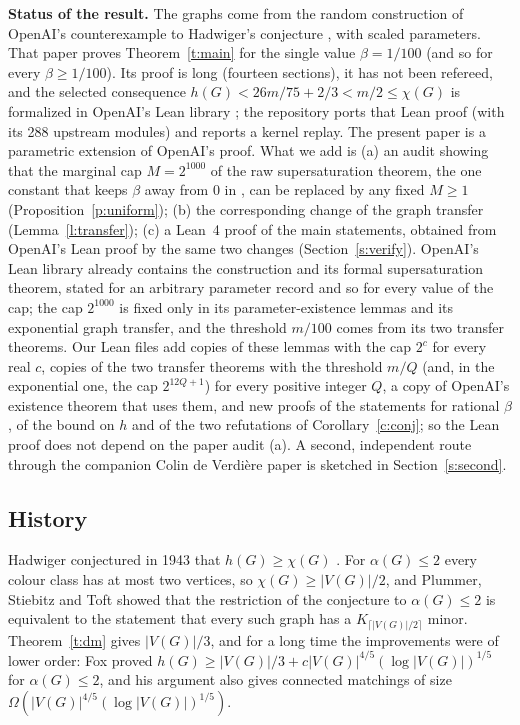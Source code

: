 \documentclass[11pt]{article}
\theoremstyle{definition}\newtheorem{conjecture}[theorem]{Conjecture}
\theoremstyle{remark}\newtheorem{remark}[theorem]{Remark}
\begin{document}
\medskip\noindent\textbf{Status of the result.} The graphs come from the random construction of OpenAI's counterexample to
Hadwiger's conjecture \cite{OAIH}, with scaled parameters. That paper proves Theorem~\ref{t:main} for the single value
$\beta=1/100$ (and so for every $\beta\ge1/100$). Its proof is long (fourteen sections), it has not been refereed, and the
selected consequence $h(G)<26m/75+2/3<m/2\le\chi(G)$ is formalized in OpenAI's Lean library \cite{OAIL}; the repository
\cite{Bon} ports that Lean proof (with its 288 upstream modules) and reports a kernel replay. The present paper is a parametric extension
of OpenAI's proof. What we add is (a) an audit showing that the marginal cap $M=2^{1000}$ of the raw supersaturation
theorem, the one constant that keeps $\beta$ away from $0$ in \cite{OAIH}, can be replaced by any fixed $M\ge1$
(Proposition~\ref{p:uniform}); (b) the corresponding change of the
graph transfer (Lemma~\ref{l:transfer}); (c) a Lean~4 proof of the main statements, obtained from OpenAI's Lean proof by
the same two changes (Section~\ref{s:verify}). OpenAI's Lean library already contains the construction and its formal
supersaturation theorem, stated for an arbitrary parameter record and so for every value of the cap; the cap $2^{1000}$ is
fixed only in its parameter-existence lemmas and its exponential graph transfer, and the threshold $m/100$ comes from its
two transfer theorems. Our Lean files add copies of these lemmas with the cap $2^c$ for every real $c$, copies of the two transfer
theorems with the threshold $m/Q$ (and, in the exponential one, the cap $2^{12Q+1}$) for every positive integer $Q$, a copy
of OpenAI's existence theorem that uses them, and new proofs of the statements for rational $\beta$, of the bound on $h$
and of the two refutations of Corollary~\ref{c:conj}; so the Lean proof does not depend on the paper audit (a). A second, independent route
through the companion Colin de Verdi\`ere paper \cite{OAIC} is sketched in Section~\ref{s:second}.

\subsection{History}\label{s:history}
Hadwiger conjectured in 1943 that $h(G)\ge\chi(G)$ \cite{Had}. For $\alpha(G)\le2$ every colour class has at most two
vertices, so $\chi(G)\ge|V(G)|/2$, and Plummer, Stiebitz and Toft \cite[Theorem~3.1]{PST} showed that the restriction of the
conjecture to $\alpha(G)\le2$ is equivalent to the statement that every such graph has a $K_{\lceil |V(G)|/2\rceil}$ minor.
Theorem~\ref{t:dm} gives $|V(G)|/3$, and for a long time the improvements were of lower order: Fox \cite[Theorem~2]{Fox}
proved $h(G)\ge |V(G)|/3+c|V(G)|^{4/5}(\log|V(G)|)^{1/5}$ for $\alpha(G)\le2$, and his argument also gives connected
matchings of size $\Omega(|V(G)|^{4/5}(\log |V(G)|)^{1/5})$.
\end{document}
